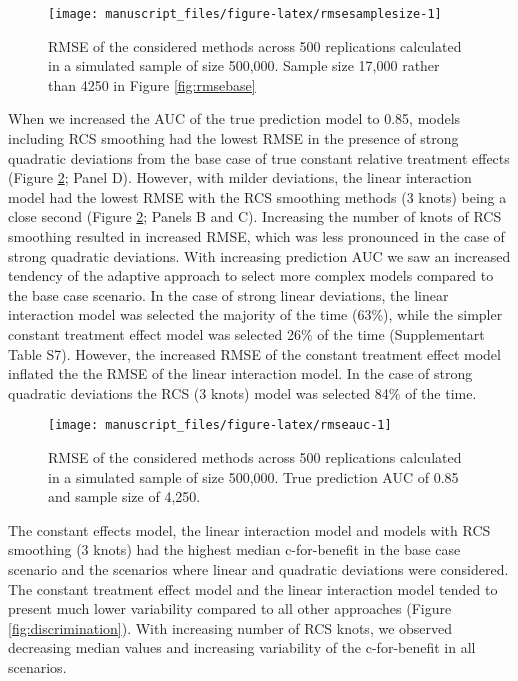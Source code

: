 \documentclass{article}
\begin{document}
\begin{figure}
\texttt{[image: manuscript\_files/figure-latex/rmsesamplesize-1]} \caption{RMSE of the considered methods across 500 replications calculated in a simulated sample of size 500,000. Sample size 17,000 rather than 4250 in Figure \ref{fig:rmsebase}}\label{fig:rmsesamplesize}
\end{figure}

When we increased the AUC of the true prediction model to 0.85, models
including RCS smoothing had the lowest RMSE in the presence of strong
quadratic deviations from the base case of true constant relative
treatment effects (Figure \ref{fig:rmseauc}; Panel D). However, with
milder deviations, the linear interaction model had the lowest RMSE with
the RCS smoothing methods (3 knots) being a close second (Figure
\ref{fig:rmseauc}; Panels B and C). Increasing the number of knots of
RCS smoothing resulted in increased RMSE, which was less pronounced in
the case of strong quadratic deviations. With increasing prediction AUC
we saw an increased tendency of the adaptive approach to select more
complex models compared to the base case scenario. In the case of strong
linear deviations, the linear interaction model was selected the
majority of the time (63\%), while the simpler constant treatment effect
model was selected 26\% of the time (Supplementart Table S7). However,
the increased RMSE of the constant treatment effect model inflated the
the RMSE of the linear interaction model. In the case of strong
quadratic deviations the RCS (3 knots) model was selected 84\% of the
time.

\begin{figure}
\texttt{[image: manuscript\_files/figure-latex/rmseauc-1]} \caption{RMSE of the considered methods across 500 replications calculated in a simulated sample of size 500,000. True prediction AUC of 0.85 and sample size of 4,250.}\label{fig:rmseauc}
\end{figure}

The constant effects model, the linear interaction model and models with
RCS smoothing (3 knots) had the highest median c-for-benefit in the base
case scenario and the scenarios where linear and quadratic deviations
were considered. The constant treatment effect model and the linear
interaction model tended to present much lower variability compared to
all other approaches (Figure \ref{fig:discrimination}). With increasing
number of RCS knots, we observed decreasing median values and increasing
variability of the c-for-benefit in all scenarios.
\end{document}
